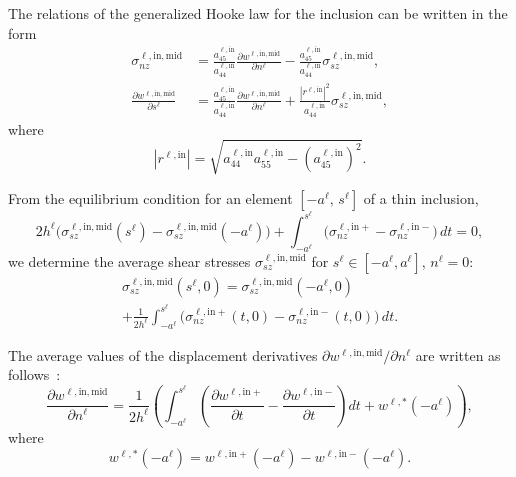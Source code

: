 The relations of the generalized Hooke law for the inclusion can be written in the form
\begin{equation}
		\label{VasilevEq21}
	\begin{aligned}
\sigma_{nz}^{\ell,\mathrm{in,mid}}
&=
\frac{a_{45}^{\ell,\mathrm{in}}}{a_{44}^{\ell,\mathrm{in}}}
\frac{\partial w^{\ell,\mathrm{in,mid}}}{\partial n^{\ell}}
-
\frac{a_{45}^{\ell,\mathrm{in}}}{a_{44}^{\ell,\mathrm{in}}}
\sigma_{sz}^{\ell,\mathrm{in,mid}},
\\
\frac{\partial w^{\ell,\mathrm{in,mid}}}{\partial s^{\ell}}
&=
\frac{a_{45}^{\ell,\mathrm{in}}}{a_{44}^{\ell,\mathrm{in}}}
\frac{\partial w^{\ell,\mathrm{in,mid}}}{\partial n^{\ell}}
+
\frac{|r^{\ell,\mathrm{in}}|^{2}}{a_{44}^{\ell,\mathrm{in}}}
\sigma_{sz}^{\ell,\mathrm{in,mid}},
\end{aligned}
\end{equation}
%
where
\begin{equation*}
	|r^{\ell,\mathrm{in}}|
	=
	\sqrt{
		a_{44}^{\ell,\mathrm{in}}a_{55}^{\ell,\mathrm{in}}
		-
		\left(a_{45}^{\ell,\mathrm{in}}\right)^2
	}.
\end{equation*}

From the equilibrium condition for an element $[-a^{\ell},\,s^{\ell}]$ of a thin inclusion,
\[
2h^{\ell}
\bigl(
\sigma_{sz}^{\ell,\mathrm{in,mid}}(s^{\ell})
-
\sigma_{sz}^{\ell,\mathrm{in,mid}}(-a^{\ell})
\bigr)
+
\int_{-a^{\ell}}^{s^{\ell}}
\bigl(
\sigma_{nz}^{\ell,\mathrm{in}+}
-
\sigma_{nz}^{\ell,\mathrm{in}-}
\bigr)\,dt
=0,
\]
we determine the average shear stresses
$\sigma_{sz}^{\ell,\mathrm{in,mid}}$
for $s^{\ell}\in[-a^{\ell},a^{\ell}]$, $n^{\ell}=0$:
\begin{multline}
	\label{VasilevEq22}
	\sigma_{sz}^{\ell,\mathrm{in,mid}}(s^{\ell},0)
	=
	\sigma_{sz}^{\ell,\mathrm{in,mid}}(-a^{\ell},0)
	\\
	+
	\frac{1}{2h^{\ell}}
	\int_{-a^{\ell}}^{s^{\ell}}
	\bigl(
	\sigma_{nz}^{\ell,\mathrm{in}+}(t,0)
	-
	\sigma_{nz}^{\ell,\mathrm{in}-}(t,0)
	\bigr)\,dt .
\end{multline}

The average values of the displacement derivatives
$\partial w^{\ell,\mathrm{in,mid}}/\partial n^{\ell}$
are written as follows~\cite{Vasilev25,Vasilev29}:
\begin{equation}
	\label{VasilevEq23}
	\frac{\partial w^{\ell,\mathrm{in,mid}}}{\partial n^{\ell}}
	=
	\frac{1}{2h^{\ell}}
	\left(
	\int_{-a^{\ell}}^{s^{\ell}}
	\left(
	\frac{\partial w^{\ell,\mathrm{in}+}}{\partial t}
	-
	\frac{\partial w^{\ell,\mathrm{in}-}}{\partial t}
	\right)\!dt
	+
	w^{\ell,*}(-a^{\ell})
	\right),
\end{equation}
where
\[
w^{\ell,*}(-a^{\ell})
=
w^{\ell,\mathrm{in}+}(-a^{\ell})
-
w^{\ell,\mathrm{in}-}(-a^{\ell}).
\]

